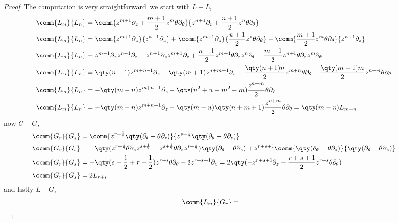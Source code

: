 \begin{proof}
    The computation is very straightforward, we start with $L-L$,
    \begin{align*}
        \comm{L_m}{L_n}&=\comm{z^{m+1}\partial_z+\frac{m+1}{2}z^m\theta\partial_\theta}{z^{n+1}\partial_z+\frac{n+1}{2}z^n\theta\partial_\theta}\\
        \comm{L_m}{L_n}&=\comm{z^{m+1}\partial_z}{z^{n+1}\partial_z}+\comm{z^{m+1}\partial_z}{\frac{n+1}{2}z^n\theta\partial_\theta}+\comm{\frac{m+1}{2}z^m\theta\partial_\theta}{z^{n+1}\partial_z}\\
        \comm{L_m}{L_n}&=z^{m+1}\partial_zz^{n+1}\partial_z-z^{n+1}\partial_zz^{m+1}\partial_z+\frac{n+1}{2}z^{m+1}\theta\partial_zz^n\partial_\theta-\frac{m+1}{2}z^{n+1}\theta\partial_zz^m\partial_\theta\\
        \comm{L_m}{L_n}&=\qty(n+1)z^{m+n+1}\partial_z-\qty(m+1)z^{n+m+1}\partial_z+\frac{\qty(n+1)n}{2}z^{m+n}\theta\partial_\theta-\frac{\qty(m+1)m}{2}z^{n+m}\theta\partial_\theta\\
        \comm{L_m}{L_n}&=-\qty(m-n)z^{m+n+1}\partial_z+\qty(n^2+n-m^2-m)\frac{z^{n+m}}{2}\theta\partial_\theta\\
        \comm{L_m}{L_n}&=-\qty(m-n)z^{m+n+1}\partial_z-\qty(m-n)\qty(n+m+1)\frac{z^{n+m}}{2}\theta\partial_\theta=\qty(m-n)L_{m+n}
    \end{align*}
    now $G-G$,
    \begin{align*}
        \comm{G_r}{G_s}&=\comm{z^{r+\frac12}\qty(\partial_\theta-\theta\partial_z)}{z^{s+\frac12}\qty(\partial_\theta-\theta\partial_z)}\\
        \comm{G_r}{G_s}&=-\qty(z^{r+\frac12}\theta\partial_z z^{s+\frac12}+z^{s+\frac12}\theta\partial_z z^{r+\frac12})\qty(\partial_\theta-\theta\partial_z)+z^{r+s+1}\comm{\qty(\partial_\theta-\theta\partial_z)}{\qty(\partial_\theta-\theta\partial_z)}\\
        \comm{G_r}{G_s}&=-\qty(s+\frac12+r+\frac12)z^{r+s}\theta\partial_\theta-2z^{r+s+1}\partial_z=2\qty(-z^{r+s+1}\partial_z-\frac{r+s+1}{2}z^{r+s}\theta\partial_\theta)\\
        \comm{G_r}{G_s}&=2L_{r+s}
    \end{align*}
    and lastly $L-G$,
    \begin{align*}
        \comm{L_m}{G_r}&=
    \end{align*}
\end{proof}